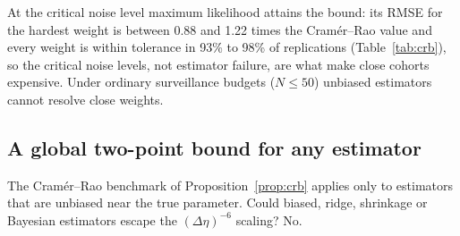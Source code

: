 At the critical noise level maximum likelihood attains the bound: its RMSE for the hardest weight is between 0.88 and 1.22 times the Cram\'er--Rao value and every weight is within tolerance in 93\% to 98\% of replications (Table~\ref{tab:crb}), so the critical noise levels, not estimator failure, are what make close cohorts expensive. Under ordinary surveillance budgets ($N\le50$) unbiased estimators cannot resolve close weights.

\subsection{A global two-point bound for any estimator}

The Cram\'er--Rao benchmark of Proposition~\ref{prop:crb} applies only to estimators that are unbiased near the true parameter. Could biased, ridge, shrinkage or Bayesian estimators escape the $(\Delta\eta)^{-6}$ scaling? No.

